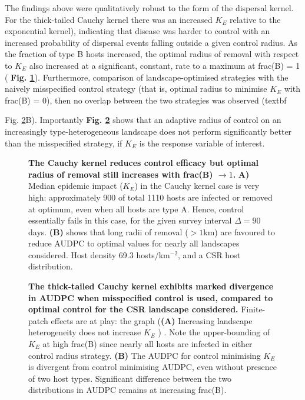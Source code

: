\documentclass[11pt,letterpaper]{article}
\begin{document}
 The findings above were qualitatively robust to the form of the dispersal kernel. For the thick-tailed Cauchy kernel there was an increased $K_E$ relative to the exponential kernel), indicating that disease was harder to control with an increased probability of dispersal events falling outside a given  control radius. As the fraction of type B hosts increased, the optimal radius of removal with respect to $K_E$ also increased at a significant, constant, rate to a maximum at frac(B) = 1 (\textbf{ Fig. {\ref{cauchy4kdeltapdcsr}}}). Furthermore, comparison of landscape-optimised strategies with the naively misspecified control strategy (that is, optimal radius to minimise $K_E$ with frac(B) = 0), then no overlap between the two strategies was observed (textbf{Fig. \ref{cauchydivergence}B). Importantly \textbf{Fig. \ref{cauchydivergence}} shows that an adaptive radius of control on an increasingly type-heterogeneous landscape does not perform significantly better than the misspecified strategy, if $K_E$ is the response variable of interest. 
 
 \begin{figure}
 	\centering
 	
 	\caption{\label{cauchy4kdeltapdcsr} \textbf{The Cauchy kernel reduces control efficacy but optimal radius of removal still increases with frac(B) $\rightarrow 1$.} \textbf{A)} Median epidemic impact ($K_{E}$) in the Cauchy kernel case is very high: approximately 900 of total 1110 hosts are infected or removed at optimum, even when all hosts are type A. Hence, control essentially fails in this case, for the given survey interval $\Delta = 90$ days. \textbf{(B)} shows that long radii of removal ($>1 $km) are favoured to reduce AUDPC to optimal values for nearly all landscapes considered.
 		 Host density 69.3 hosts/km$^{-2}$, and a CSR host distribution.}
 \end{figure}
 
 \begin{figure}
 	\centering
 	
 	\caption{\label{cauchydivergence} \textbf{The thick-tailed Cauchy kernel exhibits marked divergence in AUDPC when misspecified control is used, compared to optimal control for the CSR landscape considered.} Finite-patch effects are at play: the graph (\textbf{(A)} Increasing landscape heterogeneity does not increase $K_E$ ) .  Note the upper-bounding of $K_E$ at high frac(B) since nearly all hosts are infected in either control radius strategy. \textbf{(B)} The AUDPC for control minimising $K_E$ is divergent from control minimising AUDPC, even without presence of two host types. Significant difference between the two distributions in AUDPC remains at increasing frac(B).}
 \end{figure}
  
}
\end{document}
